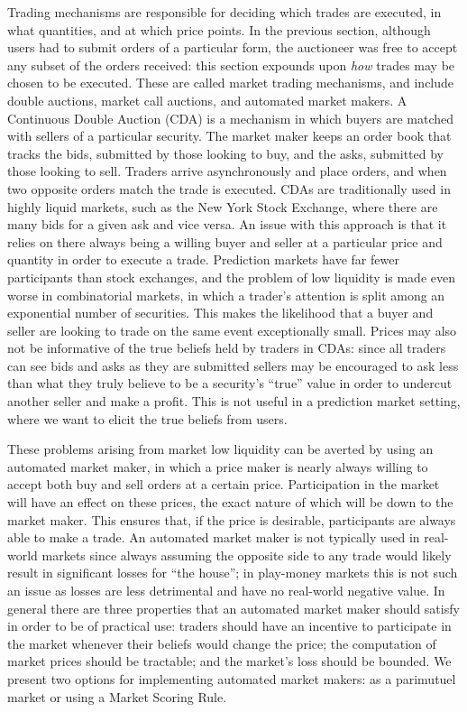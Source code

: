 Trading mechanisms are responsible for deciding which trades are executed, in
what quantities, and at which price points. In the previous section, although
users had to submit orders of a particular form, the auctioneer was free to
accept any subset of the orders received: this section expounds upon \emph{how}
trades may be chosen to be executed. These are called market trading
mechanisms, and include double auctions, market call auctions, and automated
market makers. A Continuous Double Auction (CDA) is a mechanism in which buyers
are matched with sellers of a particular security. The market maker keeps an
order book that tracks the bids, submitted by those looking to buy, and the
asks, submitted by those looking to sell. Traders arrive asynchronously and
place orders, and when two opposite orders match the trade is executed. CDAs
are traditionally used in highly liquid markets, such as the New York Stock
Exchange, where there are many bids for a given ask and vice versa. An issue
with this approach is that it relies on there always being a willing buyer and
seller at a particular price and quantity in order to execute a trade.
Prediction markets have far fewer participants than stock exchanges, and the
problem of low liquidity is made even worse in combinatorial markets, in which
a trader's attention is split among an exponential number of securities. This
makes the likelihood that a buyer and seller are looking to trade on the same
event exceptionally small. Prices may also not be informative of the true
beliefs held by traders in CDAs: since all traders can see bids and asks as
they are submitted sellers may be encouraged to ask less than what they truly
believe to be a security's ``true'' value in order to undercut another seller
and make a profit. This is not useful in a prediction market setting, where we
want to elicit the true beliefs from users.

These problems arising from market low liquidity can be averted by using an
automated market maker, in which a price maker is nearly always willing to
accept both buy and sell orders at a certain price. Participation in the market
will have an effect on these prices, the exact nature of which will be down to
the market maker. This ensures that, if the price is desirable, participants
are always able to make a trade. An automated market maker is not typically
used in real-world markets since always assuming the opposite side to any trade
would likely result in significant losses for ``the house''; in play-money
markets this is not such an issue as losses are less detrimental and have no
real-world negative value. In general there are three properties that an
automated market maker should satisfy in order to be of practical use: traders
should have an incentive to participate in the market whenever their beliefs
would change the price; the computation of market prices should be tractable;
and the market's loss should be bounded. We present two options for
implementing automated market makers: as a parimutuel market or using a Market
Scoring Rule.

